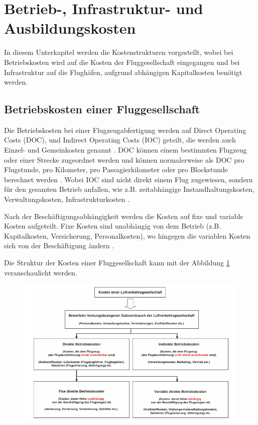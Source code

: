 \section{Betrieb-, Infrastruktur- und Ausbildungskosten}
\label{s:Kosten}
In diesem Unterkapitel werden die Kostenstrukturen vorgestellt, wobei bei Betriebskosten wird auf die Kosten der Fluggesellschaft
eingegangen und bei Infrastruktur auf die Flughäfen, aufgrund abhängigen Kapitalkosten benötigt werden.

\subsection{Betriebskosten einer Fluggesellschaft}

Die Betriebskosten bei einer Flugzeugabfertigung werden auf Direct Operating Costs (DOC), und Indirect Operating Costs 
(IOC) geteilt, die werden auch Einzel- und Gemeinkosten genannt \cite{conrady2019luftverkehr}. 
DOC können einem bestimmten Flugzeug oder einer Strecke zugeordnet 
werden und können normalerweise als DOC pro Flugstunde, pro Kilometer, pro Passagierkilometer oder pro Blockstunde 
berechnet werden \cite{mensen2013handbuch}. 
Wobei IOC sind nicht direkt einem Flug zugewiesen, sondern für den gesamten Betrieb anfallen, wie z.B. zeitabhängige 
Instandhaltungskosten, Verwaltungskosten, Infrastrukturkosten \cite{mensen2013handbuch}. 

Nach der Beschäftigungsabhängigkeit werden die Kosten auf fixe und variable Kosten aufgeteilt. 
Fixe Kosten sind unabhängig von dem Betrieb (z.B. Kapitalkosten, Versicherung, Personalkosten), 
wo hingegen die variablen Kosten sich von der Beschäftigung ändern \cite{mensen2013handbuch}.

Die Struktur der Kosten einer Fluggesellschaft kann mit der Abbildung \ref{doc} veranschaulicht werden.

\begin{figure}[h]
	\centering
	\includegraphics[width=0.9\linewidth]{Bilder/Systematik der DOC_Berechnung.png}
	\caption[DOC]{ \cite{mensen2013handbuch}}
	\label{doc}
\end{figure}


